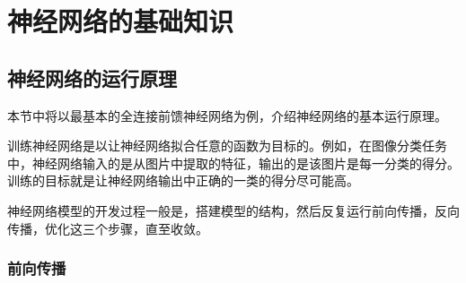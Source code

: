 \chapter{神经网络的基础知识}

\section{神经网络的运行原理} \label{nn-principal}

本节中将以最基本的全连接前馈神经网络为例，介绍神经网络的基本运行原理。

训练神经网络是以让神经网络拟合任意的函数为目标的。例如，在图像分类任务中，神经网络输入的是从图片中提取的特征，输出的是该图片是每一分类的得分。训练的目标就是让神经网络输出中正确的一类的得分尽可能高。

神经网络模型的开发过程一般是，搭建模型的结构，然后反复运行前向传播，反向传播，优化这三个步骤，直至收敛。

\subsection{前向传播} \label{nn-forward}


